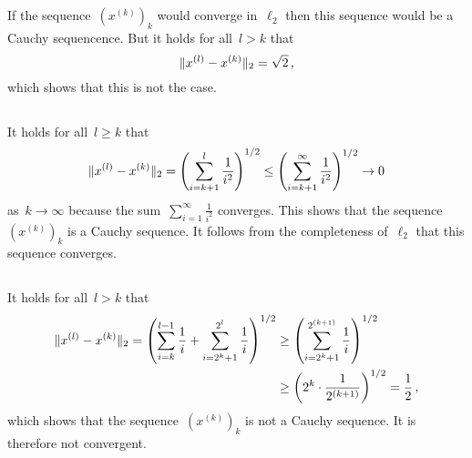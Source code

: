\section{}





\subsection{}

If the sequence~$(x^{(k)})_k$ would converge in~$\ell_2$ then this sequence would be a Cauchy sequencence.
But it holds for all~$l > k$ that
\[
    \lVert x^{(l)} - x^{(k)} \rVert_2
  = \sqrt{2} \,,
\]
which shows that this is not the case.





\subsection{}

It holds for all~$l \geq k$ that
\[
        \lVert x^{(l)} - x^{(k)} \rVert_2
  =     \left( \sum_{i=k+1}^l \frac{1}{i^2} \right)^{1/2}
  \leq  \left( \sum_{i=k+1}^\infty \frac{1}{i^2} \right)^{1/2}
  \to   0
\]
as~$k \to \infty$ because the sum~$\sum_{i=1}^\infty \frac{1}{i^2}$ converges.
This shows that the sequence~$(x^{(k)})_k$ is a Cauchy sequence.
It follows from the completeness of~$\ell_2$ that this sequence converges.





\subsection{}

It holds for all~$l > k$ that
\begin{align*}
        \lVert x^{(l)} - x^{(k)} \rVert_2
   =    \left( \sum_{i=k}^{l-1} \frac{1}{i} + \sum_{i=2^k+1}^{2^l} \frac{1}{i} \right)^{1/2}
  &\geq \left( \sum_{i=2^k+1}^{2^{(k+1)}} \frac{1}{i} \right)^{1/2} \\
  &\geq \left( 2^k \cdot \frac{1}{2^{(k+1)}} \right)^{1/2}
   =    \frac{1}{2} \,,
\end{align*}
which shows that the sequence~$(x^{(k)})_k$ is not a Cauchy sequence.
It is therefore not convergent.




